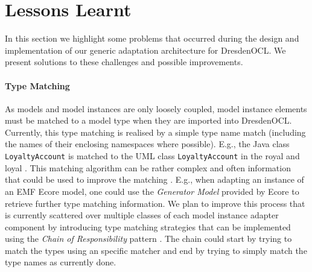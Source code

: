 \section{Lessons Learnt}
\label{sec:lessons}

  In this section we highlight some problems that occurred during the design
  and implementation of our generic adaptation architecture for DresdenOCL.
  We present  solutions to these challenges and possible improvements.

	\paragraph{Type Matching\add{:}}
	As models and model instances are only loosely 
	coupled, model instance elements must be matched to a model type
	when they are imported into DresdenOCL. Currently, this type matching is realised by a simple type name match (including the names of 
	their enclosing namespaces where possible). E.g., the Java class \texttt{LoyaltyAccount} is
	matched to the UML class \texttt{LoyaltyAccount} in the royal and loyal .
	This matching algorithm can be rather complex and often information  that could be 
	used to improve the matching . E.g., when adapting an instance of an EMF 
	Ecore model, one could use the \emph{Generator Model} provided by Ecore to
	retrieve further type matching information. We plan to improve this process
	that is currently scattered over multiple classes of each model instance 
	adapter component by introducing type matching strategies that 
	can be implemented using the \emph{Chain of Responsibility} 
	pattern \cite{gamma:dp}. The chain could start by trying to match the 
	types using an  specific matcher and end by trying to 
	simply match the type names as currently done.
	
